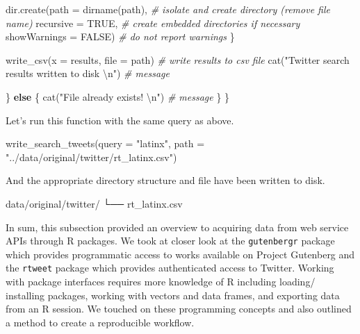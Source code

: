 \documentclass[
]{article}
\newenvironment{Shaded}{\begin{snugshade}}{\end{snugshade}}
\newcommand{\AttributeTok}[1]{\textcolor[rgb]{0.77,0.63,0.00}{#1}}
\newcommand{\CommentTok}[1]{\textcolor[rgb]{0.56,0.35,0.01}{\textit{#1}}}
\newcommand{\ConstantTok}[1]{\textcolor[rgb]{0.00,0.00,0.00}{#1}}
\newcommand{\ControlFlowTok}[1]{\textcolor[rgb]{0.13,0.29,0.53}{\textbf{#1}}}
\newcommand{\ExtensionTok}[1]{#1}
\newcommand{\FunctionTok}[1]{\textcolor[rgb]{0.00,0.00,0.00}{#1}}
\newcommand{\NormalTok}[1]{#1}
\newcommand{\SpecialCharTok}[1]{\textcolor[rgb]{0.00,0.00,0.00}{#1}}
\newcommand{\StringTok}[1]{\textcolor[rgb]{0.31,0.60,0.02}{#1}}
\begin{document}
\begin{Shaded}
\begin{Highlighting}[]
        \FunctionTok{dir.create}\NormalTok{(}\AttributeTok{path =} \FunctionTok{dirname}\NormalTok{(path), }\CommentTok{\# isolate and create directory (remove file name)}
                   \AttributeTok{recursive =} \ConstantTok{TRUE}\NormalTok{, }\CommentTok{\# create embedded directories if necessary}
                   \AttributeTok{showWarnings =} \ConstantTok{FALSE}\NormalTok{) }\CommentTok{\# do not report warnings}
\NormalTok{      \}}
      
      \FunctionTok{write\_csv}\NormalTok{(}\AttributeTok{x =}\NormalTok{ results, }\AttributeTok{file =}\NormalTok{ path) }\CommentTok{\# write results to csv file }
      \FunctionTok{cat}\NormalTok{(}\StringTok{"Twitter search results written to disk }\SpecialCharTok{\textbackslash{}n}\StringTok{"}\NormalTok{) }\CommentTok{\# message}
      
\NormalTok{    \} }\ControlFlowTok{else}\NormalTok{ \{}
      \FunctionTok{cat}\NormalTok{(}\StringTok{"File already exists! }\SpecialCharTok{\textbackslash{}n}\StringTok{"}\NormalTok{) }\CommentTok{\# message}
\NormalTok{    \}}
\NormalTok{  \}}
\end{Highlighting}
\end{Shaded}

Let's run this function with the same query as above.

\begin{Shaded}
\begin{Highlighting}[]
\FunctionTok{write\_search\_tweets}\NormalTok{(}\AttributeTok{query =} \StringTok{"latinx"}\NormalTok{, }\AttributeTok{path =} \StringTok{"../data/original/twitter/rt\_latinx.csv"}\NormalTok{)}
\end{Highlighting}
\end{Shaded}

And the appropriate directory structure and file have been written to disk.

\begin{Shaded}
\begin{Highlighting}[]
\ExtensionTok{data/original/twitter/}
\ExtensionTok{└──}\NormalTok{ rt\_latinx.csv}
\end{Highlighting}
\end{Shaded}

In sum, this subsection provided an overview to acquiring data from web service APIs through R packages. We took at closer look at the \texttt{gutenbergr} package which provides programmatic access to works available on Project Gutenberg and the \texttt{rtweet} package which provides authenticated access to Twitter. Working with package interfaces requires more knowledge of R including loading/ installing packages, working with vectors and data frames, and exporting data from an R session. We touched on these programming concepts and also outlined a method to create a reproducible workflow.
\end{document}
